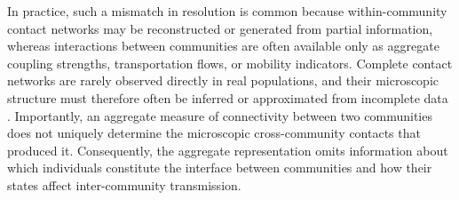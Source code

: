 \documentclass[a4paper,fleqn]{cas-sc}
\begin{document}
In practice, such a mismatch in resolution is common because within-community contact networks may be reconstructed or generated from partial information, whereas interactions between communities are often available only as aggregate coupling strengths, transportation flows, or mobility indicators. Complete contact networks are rarely observed directly in real populations, and their microscopic structure must therefore often be inferred or approximated from incomplete data \cite{danon2011}. Importantly, an aggregate measure of connectivity between two communities does not uniquely determine the microscopic cross-community contacts that produced it. Consequently, the aggregate representation omits information about which individuals constitute the interface between communities and how their states affect inter-community transmission.

\end{document}
